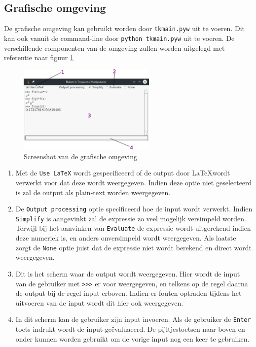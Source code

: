 \documentclass[a4paper]{article}
\begin{document}
\subsection{Grafische omgeving}
De grafische omgeving kan gebruikt worden door \texttt{tkmain.pyw} uit te voeren. Dit kan ook vanuit de command-line door \texttt{python tkmain.pyw} uit te voeren.  De verschillende componenten van de omgeving zullen worden uitgelegd met referentie naar figuur \ref{fig:screenshot}

\begin{figure}[!htb]
  \centering
  \includegraphics[width=0.6\textwidth]{screenshot.png}
  \caption{Screenshot van de grafische omgeving}
  \label{fig:screenshot}
\end{figure}

\begin{enumerate}
\item Met de \texttt{Use LaTeX} wordt gespecificeerd of de output door \LaTeX wordt verwerkt voor dat deze wordt weergegeven. Indien deze optie niet geselecteerd is zal de output als plain-text worden weergegeven.
\item De \texttt{Output processing} optie specificeerd hoe de input wordt verwerkt. Indien \texttt{Simplify} is aangevinkt zal de expressie zo veel mogelijk versimpeld worden. Terwijl bij het aanvinken van \texttt{Evaluate} de expressie wordt uitgerekend indien deze numeriek is, en anders onversimpeld wordt weergegeven. Als laatste zorgt de \texttt{None} optie juist dat de expressie niet wordt berekend en direct wordt weergegeven.
\item Dit is het scherm waar de output wordt weergegeven. Hier wordt de input van de gebruiker met \texttt{>>>} er voor weergegeven, en telkens op de regel daarna de output bij de regel input erboven. Indien er fouten optraden tijdens het uitvoeren van de input wordt dit hier ook weergegeven.
\item In dit scherm kan de gebruiker zijn input invoeren. Als de gebruiker de \texttt{Enter} toets indrukt wordt de input ge\"evaluaeerd. De pijltjestoetsen naar boven en onder kunnen worden gebruikt om de vorige input nog een keer te gebruiken.
\end{enumerate}
\end{document}
